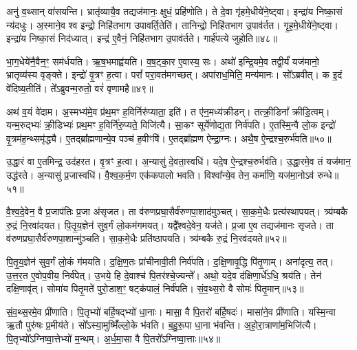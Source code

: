 अनु॑ व॒थ्सान् वा॑सयन्ति।
भ्रातृ॑व्यायै॒व तद्यज॑मानः॒ क्षुधं॒ प्रहि॑णोति।
ते दे॒वा गृ॑हमे॒धीये॑ने॒ष्ट्वा।
इन्द्रा॑य निष्का॒सं न्य॑दधुः।
अ॒स्माने॒व श्व इन्द्रो॒ निहि॑तभाग उपावर्ति॒तेति॑।
तानिन्द्रो॒ निहि॑तभाग उ॒पाव॑र्तत।
गृ॒ह॒मे॒धीये॑ने॒ष्ट्वा।
इन्द्रा॑य निष्का॒सं निद॑ध्यात्।
इन्द्र॑ ए॒वैनं॒ निहि॑तभाग उ॒पाव॑र्तते।
गार्\mbox{}ह॑पत्ये जुहोति॥४८॥

भा॒ग॒धेये॑नै॒वैन॒ꣳ॒ सम॑र्धयति।
ऋ॒ष॒भमाह्व॑यति।
व॒ष॒ट्का॒र ए॒वास्य॒ सः।
अथो॑ इन्द्रि॒यमे॒व तद्वी॒र्यं॑ यज॑मानो॒ भ्रातृव्य॑स्य वृङ्क्ते।
इन्द्रो॑ वृ॒त्रꣳ ह॒त्वा।
परां᳚ परा॒वत॑मगच्छत्।
अपा॑राध॒मिति॒ मन्य॑मानः।
सो᳚ऽब्रवीत्।
क इ॒दं वे॑दिष्य॒तीति॑।
ते᳚ऽब्रुवन्म॒रुतो॒ वरं॑ वृणामहै॥४९॥

अथ॑ व॒यं वे॑दाम।
अ॒स्मभ्य॑मे॒व प्र॑थ॒मꣳ ह॒विर्निरु॑प्याता॒ इति॑।
त ए॑न॒मध्य॑क्रीडन्।
तत्क्री॒डिनां᳚ क्रीडि॒त्वम्।
यन्म॒रुद्भ्यः॑ क्री॒डिभ्यः॑ प्रथ॒मꣳ ह॒विर्नि॑रु॒प्यते॒ विजि॑त्यै।
सा॒कꣳ सूर्ये॑णोद्य॒ता निर्व॑पति।
ए॒तस्मि॒न्वै लो॒क इन्द्रो॑ वृ॒त्रम॑ह॒न्थ्समृ॑द्ध्यै।
ए॒तद्ब्रा᳚ह्मणान्ये॒व पञ्च॑ ह॒वीꣳषि॑।
ए॒तद्ब्रा᳚ह्मण ऐन्द्रा॒ग्नः।
अथै॒ष ऐ॒न्द्रश्च॒रुर्भ॑वति॥५०॥

उ॒द्धा॒रं वा ए॒तमिन्द्र॒ उद॑हरत।
वृ॒त्रꣳ ह॒त्वा।
अ॒न्यासु॑ दे॒वता॒स्वधि॑।
यदे॒ष ऐ॒न्द्रश्च॒रुर्भव॑ति।
उ॒द्धा॒रमे॒व तं यज॑मान॒ उद्ध॑रते।
अ॒न्यासु॑ प्र॒जास्वधि॑।
वै॒श्व॒क॒र्म॒ण एक॑कपालो भवति।
विश्वा᳚न्ये॒व तेन॒ कर्मा॑णि॒ यज॑मा॒नो\-ऽव॑ रुन्धे॥५१॥\anuvakamend[ऋ॒द्ध्य॒ते॒\-ऽभ्य॑ञ्जते जुहोति वृणामहै भवत्य॒ष्टौ च॑]

वै॒श्व॒दे॒वेन॒ वै प्र॒जा\-प॑तिः प्र॒जा अ॑\-सृजत।
ता व॑रुण\-प्रघा॒सैर्व॑रुण\-पा॒शाद॑मुञ्चत्।
सा॒क॒मे॒धैः प्रत्य॑स्थापयत्।
त्र्य॑म्बकै रु॒द्रं नि॒रवा॑दयत।
पि॒तृ॒य॒ज्ञेन॑ सुव॒र्गं लो॒कम॑गमयत्।
यद्वै᳚श्वदे॒वेन॒ यज॑ते।
प्र॒जा ए॒व तद्यज॑मानः \-सृजते।
ता व॑रुणप्रघा॒सैर्व॑रुणपा॒शान्मु॑ञ्चति।
सा॒क॒मे॒धैः प्रति॑\-ष्ठापयति।
त्र्य॑म्बकै रु॒द्रं नि॒रव॑दयते॥५२॥

पि॒तृ॒य॒ज्ञेन॑ सुव॒र्गं लो॒कं ग॑मयति।
द॒क्षि॒ण॒तः प्रा॑चीनावी॒ती निर्व॑पति।
द॒क्षि॒णावृ॒द्धि पि॑तृ॒णाम्।
अना॑दृत्य॒ तत्।
उ॒त्त॒र॒त ए॒वोप॒वीय॒ निर्व॑पेत्।
उ॒भये॒ हि दे॒वाश्च॑ पि॒तर॑श्चे॒ज्यन्ते᳚।
अथो॒ यदे॒व द॑क्षिणा॒र्धे॑ऽधि॒ श्रय॑ति।
तेन॑ दक्षि॒णावृ॑त्।
सोमा॑य पितृ॒मते॑ पुरो॒डाश॒ꣳ॒ षट्क॑पालं॒ निर्व॑पति।
सं॒व॒थ्स॒रो वै सोमः॑ पितृ॒मान्॥५३॥

सं॒व॒थ्स॒रमे॒व प्री॑णाति।
पि॒तृभ्यो॑ बर्\mbox{}हि॒षद्भ्यो॑ धा॒नाः।
मासा॒ वै पि॒तरो॑ बर्\mbox{}हि॒षदः॑।
मासा॑ने॒व प्री॑णाति।
यस्मि॒न्वा ऋ॒तौ पुरु॑षः प्र॒मीय॑ते।
सो᳚ऽस्या॒मुष्मिँ॑ल्लो॒के भ॑वति।
ब॒हु॒रू॒पा धा॒ना भ॑वन्ति।
अ॒हो॒रा॒त्राणा॑म॒भिजि॑त्यै।
पि॒तृभ्यो᳚\-ऽग्निष्वा॒त्तेभ्यो॑ म॒न्थम्।
अ॒र्ध॒मा॒सा वै पि॒तरो᳚\-ऽग्निष्वा॒त्ताः॥५४॥

